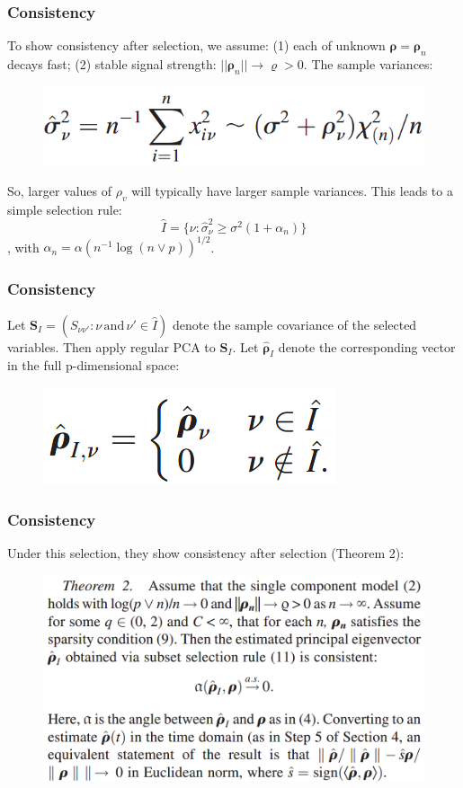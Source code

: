 \documentclass{beamer}
\begin{document}
	
	\begin{frame}
		\frametitle{Consistency}
		To show consistency after selection, we assume: (1) each of unknown $\bm{\rho} = \bm{\rho}_n$ decays fast; (2) stable signal strength: $||\bm{\rho}_n|| \to \varrho > 0$.
		The sample variances:
		\begin{figure}
			\includegraphics[width=0.5\linewidth]{image004.png}
		\end{figure}  
		So, larger values of $\rho_v$ will typically have larger sample variances. This leads to a simple selection rule:
		$$\hat{I} = \{{\nu: \hat\sigma}^2_{\nu} \geq \sigma^2(1+\alpha_n)\}$$
		, with $\alpha_n = \alpha(n^{-1}\log(n \vee p))^{1/2}$.
	\end{frame}
	
	
	\begin{frame}
		\frametitle{Consistency}
		Let $\bm{S}_I = (S_{\nu\nu'}: \nu\, \text{and}\, \nu' \in \hat{I})$ denote the sample covariance of the selected variables. Then apply regular PCA to $\bm{S}_I$. Let $\hat{\bm{\rho}}_I$ denote the corresponding vector in the full p-dimensional space:
		\begin{figure}
			\includegraphics[width=0.3\linewidth]{image005.png}
		\end{figure}
	\end{frame}
	
	\begin{frame}
		\frametitle{Consistency}
		Under this selection, they show consistency after selection (Theorem 2):
		\begin{figure}
			\includegraphics[width=0.8\linewidth]{image006.png}
		\end{figure}
	\end{frame}
	
\end{document}
